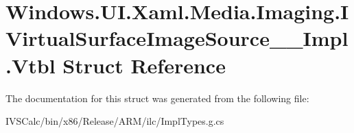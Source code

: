 \hypertarget{struct_windows_1_1_u_i_1_1_xaml_1_1_media_1_1_imaging_1_1_i_virtual_surface_image_source_____impl_1_1_vtbl}{}\section{Windows.\+U\+I.\+Xaml.\+Media.\+Imaging.\+I\+Virtual\+Surface\+Image\+Source\+\_\+\+\_\+\+Impl.\+Vtbl Struct Reference}
\label{struct_windows_1_1_u_i_1_1_xaml_1_1_media_1_1_imaging_1_1_i_virtual_surface_image_source_____impl_1_1_vtbl}


The documentation for this struct was generated from the following file\+:\begin{DoxyCompactItemize}
\item 
I\+V\+S\+Calc/bin/x86/\+Release/\+A\+R\+M/ilc/Impl\+Types.\+g.\+cs\end{DoxyCompactItemize}
